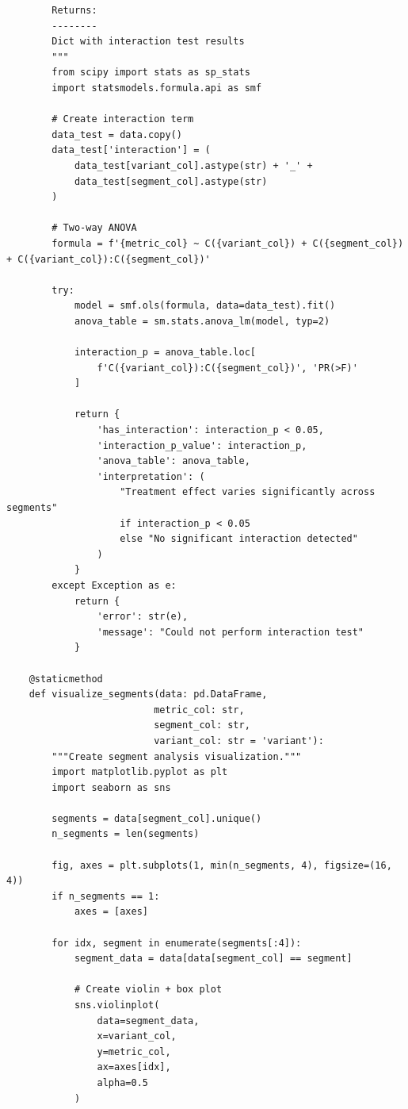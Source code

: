 \begin{lstlisting}
        Returns:
        --------
        Dict with interaction test results
        """
        from scipy import stats as sp_stats
        import statsmodels.formula.api as smf

        # Create interaction term
        data_test = data.copy()
        data_test['interaction'] = (
            data_test[variant_col].astype(str) + '_' +
            data_test[segment_col].astype(str)
        )

        # Two-way ANOVA
        formula = f'{metric_col} ~ C({variant_col}) + C({segment_col}) + C({variant_col}):C({segment_col})'

        try:
            model = smf.ols(formula, data=data_test).fit()
            anova_table = sm.stats.anova_lm(model, typ=2)

            interaction_p = anova_table.loc[
                f'C({variant_col}):C({segment_col})', 'PR(>F)'
            ]

            return {
                'has_interaction': interaction_p < 0.05,
                'interaction_p_value': interaction_p,
                'anova_table': anova_table,
                'interpretation': (
                    "Treatment effect varies significantly across segments"
                    if interaction_p < 0.05
                    else "No significant interaction detected"
                )
            }
        except Exception as e:
            return {
                'error': str(e),
                'message': "Could not perform interaction test"
            }

    @staticmethod
    def visualize_segments(data: pd.DataFrame,
                          metric_col: str,
                          segment_col: str,
                          variant_col: str = 'variant'):
        """Create segment analysis visualization."""
        import matplotlib.pyplot as plt
        import seaborn as sns

        segments = data[segment_col].unique()
        n_segments = len(segments)

        fig, axes = plt.subplots(1, min(n_segments, 4), figsize=(16, 4))
        if n_segments == 1:
            axes = [axes]

        for idx, segment in enumerate(segments[:4]):
            segment_data = data[data[segment_col] == segment]

            # Create violin + box plot
            sns.violinplot(
                data=segment_data,
                x=variant_col,
                y=metric_col,
                ax=axes[idx],
                alpha=0.5
            )


\end{lstlisting}
